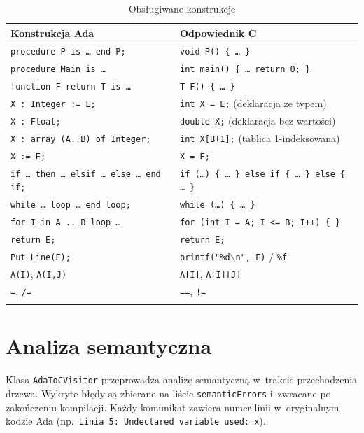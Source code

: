 \documentclass[12pt,a4paper]{article}
\begin{document}
\begin{longtable}{ll}
\toprule
\textbf{Konstrukcja Ada} & \textbf{Odpowiednik C} \\
\midrule
\endhead
\texttt{procedure P is \ldots\ end P;} & \texttt{void P() \{ \ldots\ \}} \\
\texttt{procedure Main is \ldots} & \texttt{int main() \{ \ldots\ return 0; \}} \\
\texttt{function F return T is \ldots} & \texttt{T F() \{ \ldots\ \}} \\
\texttt{X : Integer := E;} & \texttt{int X = E;} (deklaracja ze typem) \\
\texttt{X : Float;} & \texttt{double X;} (deklaracja bez wartości) \\
\texttt{X : array (A..B) of Integer;} & \texttt{int X[B+1];} (tablica 1-indeksowana) \\
\texttt{X := E;} & \texttt{X = E;} \\
\texttt{if \ldots\ then \ldots\ elsif \ldots\ else \ldots\ end if;} & \texttt{if (\ldots) \{ \ldots\ \} else if \{ \ldots\ \} else \{ \ldots\ \}} \\
\texttt{while \ldots\ loop \ldots\ end loop;} & \texttt{while (\ldots) \{ \ldots\ \}} \\
\texttt{for I in A .. B loop \ldots} & \texttt{for (int I = A; I <= B; I++) \{ \}} \\
\texttt{return E;} & \texttt{return E;} \\
\texttt{Put\_Line(E);} & \texttt{printf("\%d$\backslash$n", E)} / \texttt{\%f} \\
\texttt{A(I)}, \texttt{A(I,J)} & \texttt{A[I]}, \texttt{A[I][J]} \\
\texttt{=}, \texttt{/=} & \texttt{==}, \texttt{!=} \\
\bottomrule
\caption{Obsługiwane konstrukcje}
\end{longtable}

\section{Analiza semantyczna}

Klasa \texttt{AdaToCVisitor} przeprowadza analizę semantyczną
w~trakcie przechodzenia drzewa. Wykryte błędy są zbierane na liście
\texttt{semanticErrors} i~zwracane po zakończeniu kompilacji.
Każdy komunikat zawiera numer linii w~oryginalnym kodzie Ada
(np.\ \texttt{Linia 5: Undeclared variable used: x}).
\end{document}
